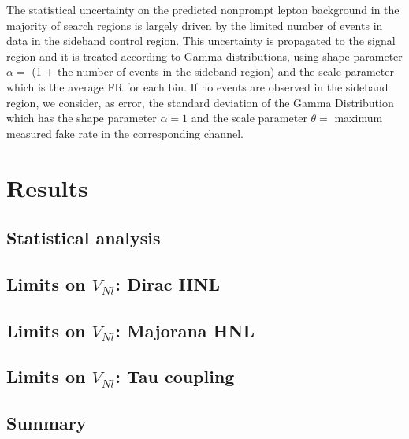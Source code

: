 The statistical uncertainty on the predicted nonprompt lepton background
in the majority of search regions is largely driven by the limited
number of events in data in the sideband control region. This uncertainty
is propagated to the signal region and it is treated according to Gamma-distributions, using shape parameter $\alpha =$ (1 +  the number of events in the sideband region) and the scale parameter which is the average FR for each bin.
If no events are observed in the sideband region, we consider, as error, the standard deviation of the Gamma Distribution which has the shape parameter $\alpha = 1$ and the scale parameter $\theta =$ maximum measured fake rate in the corresponding channel.  










\clearpage
\section{Results}
\subsection{Statistical analysis}
\subsection{Limits on $V_{Nl}$: Dirac HNL}
\subsection{Limits on $V_{Nl}$: Majorana HNL}
\subsection{Limits on $V_{Nl}$: Tau coupling}

\subsection{Summary}

